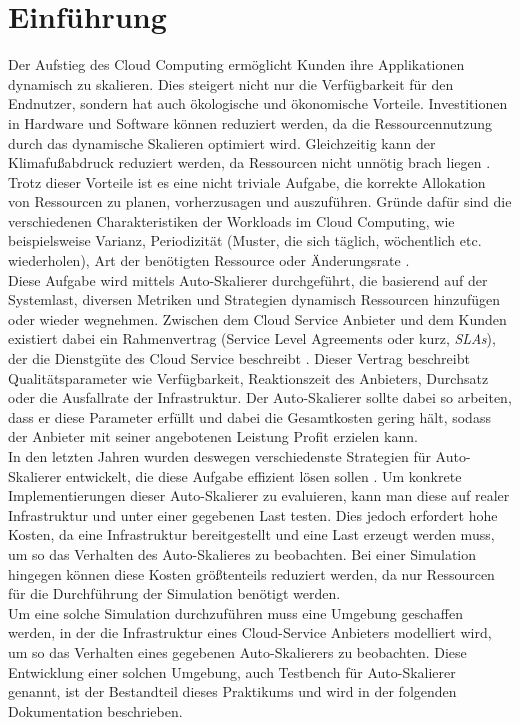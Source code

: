 
\chapter{Einführung}
\label{ch:Introduction}
Der Aufstieg des Cloud Computing ermöglicht Kunden ihre Applikationen dynamisch zu skalieren. Dies steigert nicht nur die Verfügbarkeit für den Endnutzer, sondern hat auch ökologische und ökonomische Vorteile. Investitionen in Hardware und Software können reduziert werden, da die Ressourcennutzung durch das dynamische Skalieren optimiert wird. Gleichzeitig kann der Klimafußabdruck reduziert werden, da Ressourcen nicht unnötig brach liegen \cite{ASurveyOn} \cite{ReviewOfAtuoScaling}. \\
Trotz dieser Vorteile ist es eine nicht triviale Aufgabe, die korrekte Allokation von Ressourcen zu planen, vorherzusagen und auszuführen. Gründe dafür sind die verschiedenen Charakteristiken der Workloads im Cloud Computing, wie beispielsweise Varianz, Periodizität (Muster, die sich täglich, wöchentlich etc. wiederholen), Art der benötigten Ressource oder Änderungsrate \cite{PEAS}. \\  
Diese Aufgabe wird mittels Auto-Skalierer durchgeführt, die basierend auf der Systemlast, diversen Metriken und Strategien dynamisch Ressourcen hinzufügen oder wieder wegnehmen. Zwischen dem Cloud Service Anbieter und dem Kunden existiert dabei ein Rahmenvertrag (Service Level Agreements oder kurz, \textit{SLAs}), der die Dienstgüte des Cloud Service beschreibt \cite{ASurveyOn}. Dieser Vertrag beschreibt Qualitätsparameter wie Verfügbarkeit, Reaktionszeit des Anbieters, Durchsatz oder die Ausfallrate der Infrastruktur. Der Auto-Skalierer sollte dabei so arbeiten, dass er diese Parameter erfüllt und dabei die Gesamtkosten gering hält, sodass der Anbieter mit seiner angebotenen Leistung Profit erzielen kann. \\
In den letzten Jahren wurden deswegen verschiedenste Strategien für Auto-Skalierer entwickelt, die diese Aufgabe effizient lösen sollen \cite{ReviewOfAtuoScaling}. Um konkrete Implementierungen dieser Auto-Skalierer zu evaluieren, kann man diese auf realer Infrastruktur und unter einer gegebenen Last testen. Dies jedoch erfordert hohe Kosten, da eine Infrastruktur bereitgestellt und eine Last erzeugt werden muss, um so das Verhalten des Auto-Skalieres zu beobachten. Bei einer Simulation hingegen können diese Kosten größtenteils reduziert werden, da nur Ressourcen für die Durchführung der Simulation benötigt werden.\\
Um eine solche Simulation durchzuführen muss eine Umgebung geschaffen werden, in der die Infrastruktur eines Cloud-Service Anbieters modelliert wird, um so das Verhalten eines gegebenen Auto-Skalierers zu beobachten. Diese Entwicklung einer solchen Umgebung, auch Testbench für Auto-Skalierer genannt, ist der Bestandteil dieses Praktikums und wird in der folgenden Dokumentation beschrieben.



